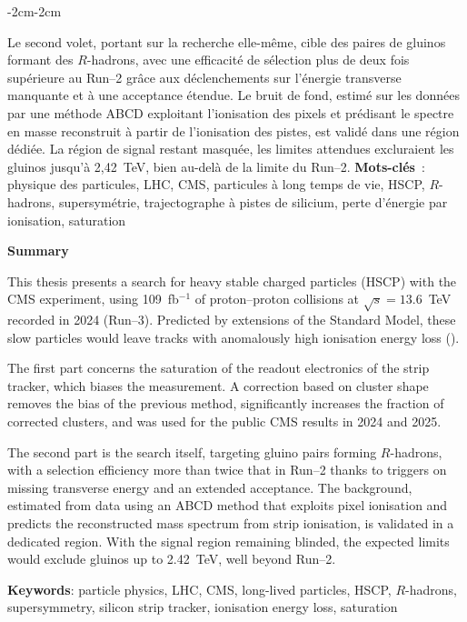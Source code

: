 \begin{changemargin}{-2cm}{-2cm}
\begin{mybox}
Le second volet, portant sur la recherche elle-même, cible des paires de gluinos formant des $R$-hadrons, avec une efficacité de sélection plus de deux fois supérieure au Run--2 grâce aux déclenchements sur l'énergie transverse manquante et à une acceptance étendue. Le bruit de fond, estimé sur les données par une méthode ABCD exploitant l'ionisation des pixels et prédisant le spectre en masse reconstruit à partir de l'ionisation des pistes, est validé dans une région dédiée. La région de signal restant masquée, les limites attendues excluraient les gluinos jusqu'à 2{,}42~TeV, bien au-delà de la limite du Run--2.
\bigskip
% 
\textbf{Mots-clés}~: physique des particules, LHC, CMS, particules à long temps de vie, HSCP, $R$-hadrons, supersymétrie, trajectographe à pistes de silicium, perte d'énergie par ionisation, saturation

\end{mybox}


\begin{mybox}

{\Large\textbf{Summary}}\bigskip

This thesis presents a search for heavy stable charged particles (HSCP) with the CMS experiment, using 109~fb$^{-1}$ of proton--proton collisions at $\sqrt{s}=13.6$~TeV recorded in 2024 (Run--3). Predicted by extensions of the Standard Model, these slow particles would leave tracks with anomalously high ionisation energy loss (\dedx).
\smallskip

The first part concerns the saturation of the readout electronics of the strip tracker, which biases the \dedx{} measurement. A correction based on cluster shape removes the bias of the previous method, significantly increases the fraction of corrected clusters, and was used for the public CMS results in 2024 and 2025.
\smallskip

The second part is the search itself, targeting gluino pairs forming $R$-hadrons, with a selection efficiency more than twice that in Run--2 thanks to triggers on missing transverse energy and an extended acceptance. The background, estimated from data using an ABCD method that exploits pixel ionisation and predicts the reconstructed mass spectrum from strip ionisation, is validated in a dedicated region. With the signal region remaining blinded, the expected limits would exclude gluinos up to 2.42~TeV, well beyond Run--2.
\bigskip

\textbf{Keywords}: particle physics, LHC, CMS, long-lived particles, HSCP, $R$-hadrons, supersymmetry, silicon strip tracker, ionisation energy loss, saturation

\end{mybox}

\end{changemargin}